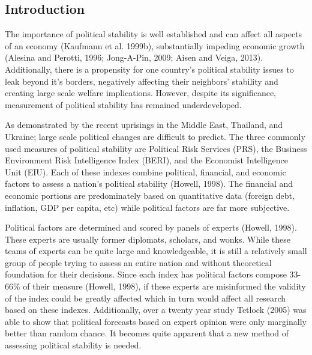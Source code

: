 \documentclass[12pt]{article}
\begin{document}
\begin{spacing}{1.5}

\section*{Introduction}

The importance of political stability is well established and can affect all aspects of an economy (Kaufmann et al. 1999b), substantially impeding economic growth (Alesina and Perotti, 1996; Jong-A-Pin, 2009; Aisen and Veiga, 2013). Additionally, there is a propensity for one country's political stability issues to leak beyond it's borders, negatively affecting their neighbors' stability and creating large scale welfare implications. However, despite its significance, measurement of political stability has remained underdeveloped. 

As demonstrated by the recent uprisings in the Middle East, Thailand, and Ukraine; large scale political changes are difficult to predict. The three commonly used measures of political stability are Political Risk Services (PRS), the Business Environment Risk Intelligence Index (BERI), and the Economist Intelligence Unit (EIU). Each of these indexes combine political, financial, and economic factors to assess a nation's political stability (Howell, 1998). The financial and economic portions are predominately based on quantitative data (foreign debt, inflation, GDP per capita, etc) while political factors are far more subjective. 

Political factors are determined and scored by panels of experts (Howell, 1998). These experts are usually former diplomats, scholars, and wonks. While these teams of experts can be quite large and knowledgeable, it is still a relatively small group of people trying to assess an entire nation and without theoretical foundation for their decisions. Since each index has political factors compose 33-66\% of their measure (Howell, 1998), if these experts are misinformed the validity of the index could be greatly affected which in turn would affect all research based on these indexes. Additionally, over a twenty year study Tetlock (2005) was able to show that political forecasts based on expert opinion were only marginally better than random chance. It becomes quite apparent that a new method of assessing political stability is needed.  


\end{spacing}
\end{document}
